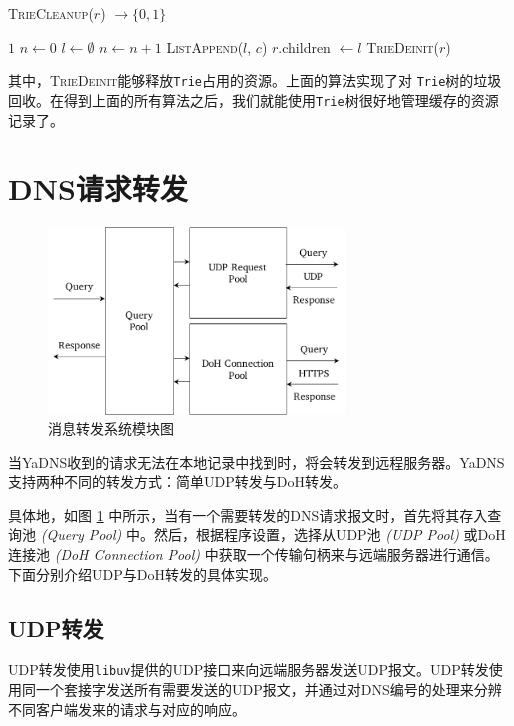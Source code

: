 \begin{algorithm}[h]
\caption{\textsc{TrieCleanup}($r$) $\rightarrow \{ 0, 1 \}$}
\label{algo:trie-cleanup}
 {
  \Return $1$\;
}
$n \gets 0$\;
$l \gets \emptyset$\;
 {
   {
    $n \gets n + 1$\;
    \textsc{ListAppend}($l$, $c$)\;
  }
}
$r$.children $\gets l$\;
 {
  \textsc{TrieDeinit}($r$)\;
  \;
}
\;
\end{algorithm}
其中，\textsc{TrieDeinit}能够释放\lstinline{Trie}占用的资源。上面的算法实现了对 \lstinline{Trie}树的垃圾回收。在得到上面的所有算法之后，我们就能使用\lstinline{Trie}树很好地管理缓存的资源记录了。

\section{DNS请求转发}

\begin{figure}[h]
  \centering
  \includegraphics[width=0.7\textwidth]{figures/relay}
  \caption{消息转发系统模块图}
  \label{fig:relay}
\end{figure}

当YaDNS收到的请求无法在本地记录中找到时，将会转发到远程服务器。YaDNS支持两种不同的转发方式：简单UDP转发与DoH转发。

具体地，如图 \ref{fig:relay} 中所示，当有一个需要转发的DNS请求报文时，首先将其存入查询池 \emph{(Query Pool)} 中。然后，根据程序设置，选择从UDP池 \emph{(UDP Pool)} 或DoH连接池 \emph{(DoH Connection Pool)} 中获取一个传输句柄来与远端服务器进行通信。下面分别介绍UDP与DoH转发的具体实现。

\subsection{UDP转发}

UDP转发使用\lstinline{libuv}提供的UDP接口来向远端服务器发送UDP报文。UDP转发使用同一个套接字发送所有需要发送的UDP报文，并通过对DNS编号的处理来分辨不同客户端发来的请求与对应的响应。

